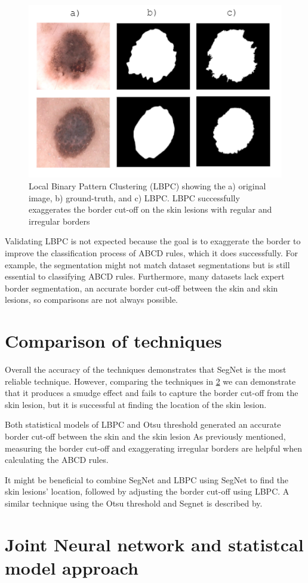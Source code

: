 \begin{figure}
\centering
\includegraphics[scale=1.2]{images/borders.PNG}
\caption{Local Binary Pattern Clustering (LBPC) showing the a) original image, b) ground-truth, and c) LBPC. LBPC successfully exaggerates the border cut-off on the skin lesions with regular and irregular borders} 
\end{figure} \label{fractal1}

Validating LBPC is not expected because the goal is to exaggerate the border to improve the classification process of ABCD rules, which it does successfully\cite{Pereira2020, Kaya2016}. For example, the segmentation might not match dataset segmentations but is still essential to classifying ABCD rules. Furthermore, many datasets lack expert border segmentation, an accurate border cut-off between the skin and skin lesions, so comparisons are not always possible.

\section{Comparison of techniques}
Overall the accuracy of the techniques demonstrates that SegNet is the most reliable technique. However, comparing the techniques in \ref{} we can demonstrate that it produces a smudge effect and fails to capture the border cut-off from the skin lesion, but it is successful at finding the location of the skin lesion.

Both statistical models of LBPC and Otsu threshold generated an accurate border cut-off between the skin and the skin lesion As previously mentioned, measuring the border cut-off and exaggerating irregular borders are helpful when calculating the ABCD rules. 

It might be beneficial to combine SegNet and LBPC using SegNet to find the skin lesions' location, followed by adjusting the border cut-off using LBPC. A similar technique using the Otsu threshold and Segnet is described by\cite{Riaz2019}.

\section{Joint Neural network and statistcal model approach}
